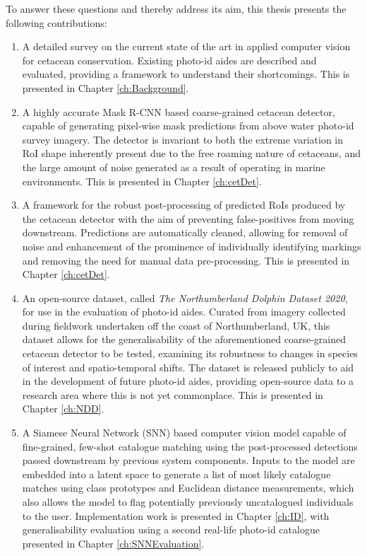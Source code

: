 \noindent To answer these questions and thereby address its aim, this thesis presents the following contributions:

\begin{enumerate}
	\item A detailed survey on the current state of the art in applied computer vision for cetacean conservation. Existing photo-id aides are described and evaluated, providing a framework to understand their shortcomings. This is presented in Chapter \ref{ch:Background}. 
	\item A highly accurate Mask R-CNN \cite{he_mask_2017} based coarse-grained cetacean detector, capable of generating pixel-wise mask predictions from above water photo-id survey imagery. The detector is invariant to both the extreme variation in RoI shape inherently present due to the free roaming nature of cetaceans, and the large amount of noise generated as a result of operating in marine environments.  This is presented in Chapter \ref{ch:cetDet}.
	\item A framework for the robust post-processing of predicted RoIs produced by the cetacean detector with the aim of preventing false-positives from moving downstream. Predictions are automatically cleaned, allowing for removal of noise and enhancement of the prominence of individually identifying markings and removing the need for manual data pre-processing. This is presented in Chapter \ref{ch:cetDet}.
	\item An open-source dataset, called \textit{The Northumberland Dolphin Dataset 2020}, for use in the evaluation of photo-id aides. Curated from imagery collected during fieldwork undertaken off the coast of Northumberland, UK, this dataset allows for the generalisability of the aforementioned coarse-grained cetacean detector to be tested, examining its robustness to changes in species of interest and spatio-temporal shifts. The dataset is released publicly to aid in the development of future photo-id aides, providing open-source data to a research area where this is not yet commonplace. This is presented in Chapter \ref{ch:NDD}.
	\item A Siamese Neural Network (SNN) based computer vision model capable of fine-grained, few-shot catalogue matching using the post-processed detections passed downstream by previous system components. Inputs to the model are embedded into a latent space to generate a list of most likely catalogue matches using class prototypes and Euclidean distance measurements, which also allows the model to flag potentially previously uncatalogued individuals to the user. Implementation work is presented in Chapter \ref{ch:ID}, with generalisability evaluation using a second real-life photo-id catalogue presented in Chapter \ref{ch:SNNEvaluation}.
\end{enumerate}

